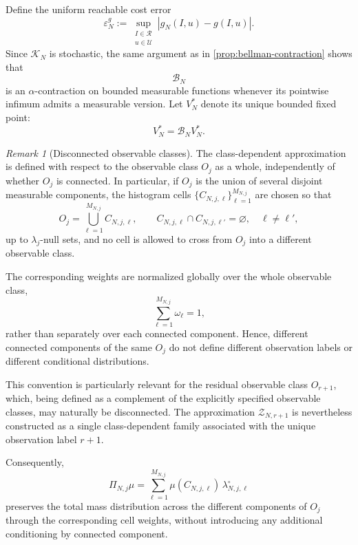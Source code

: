 \documentclass[10pt,twocolumn]{article}
\theoremstyle{remark}
\newtheorem{remark}{Remark}
\newcommand{\Ucal}{\mathcal{U}}
\begin{document}
Define the uniform reachable cost error
\begin{equation}
	\varepsilon_N^g
	:=
	\sup_{\substack{I\in\mathcal R\\u\in\Ucal}}
	|g_N(I,u)-g(I,u)|.
	\label{eq:stage-cost-approximation-error}
\end{equation}
Since \(\mathcal K_N\) is stochastic, the same argument as in \cref{prop:bellman-contraction} shows that
\[
\mathcal B_N
\]
is an \(\alpha\)-contraction on bounded measurable functions whenever its pointwise infimum admits a measurable version. Let \(V_N^*\) denote its unique bounded fixed point:
\begin{equation*}
	V_N^*=\mathcal B_NV_N^*.
	\label{eq:approximate-value-equation}
\end{equation*}

\begin{remark}[Disconnected observable classes]
	\label{rem:disconnected-observable-classes}
	The class-dependent approximation is defined with respect to the observable class
	$O_j$ as a whole, independently of whether $O_j$ is connected. In particular,
	if $O_j$ is the union of several disjoint measurable components, the histogram
	cells $\{C_{N,j,\ell}\}_{\ell=1}^{M_{N,j}}$ are chosen so that
	\[
	O_j=\bigcup_{\ell=1}^{M_{N,j}} C_{N,j,\ell},
	\qquad
	C_{N,j,\ell}\cap C_{N,j,\ell'}=\varnothing,
	\quad \ell\neq \ell',
	\]
	up to $\lambda_j$-null sets, and no cell is allowed to cross from $O_j$ into a
	different observable class.
	
	The corresponding weights are normalized globally over the whole observable
	class,
	\[
	\sum_{\ell=1}^{M_{N,j}}\omega_\ell = 1,
	\]
	rather than separately over each connected component. Hence, different connected
	components of the same $O_j$ do not define different observation labels or
	different conditional distributions.
	
	This convention is particularly relevant for the residual observable class
	$O_{r+1}$, which, being defined as a complement of the explicitly specified
	observable classes, may naturally be disconnected. The approximation
	$\mathcal Z_{N,r+1}$ is nevertheless constructed as a single class-dependent
	family associated with the unique observation label $r+1$.
	
	Consequently,
	\[
	\Pi_{N,j}\mu
	=
	\sum_{\ell=1}^{M_{N,j}}
	\mu(C_{N,j,\ell})\,\lambda_{N,j,\ell}^{\circ}
	\]
	preserves the total mass distribution across the different components of $O_j$
	through the corresponding cell weights, without introducing any additional
	conditioning by connected component.
\end{remark}
\end{document}
